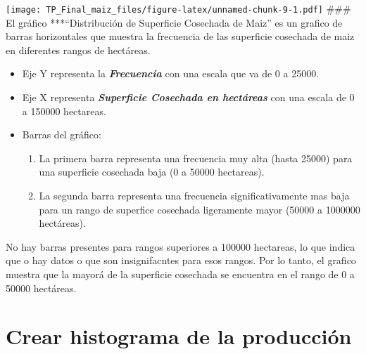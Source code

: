 \documentclass[
]{article}
\newenvironment{Shaded}{\begin{snugshade}}{\end{snugshade}}
\newcommand{\AttributeTok}[1]{\textcolor[rgb]{0.13,0.29,0.53}{#1}}
\newcommand{\DecValTok}[1]{\textcolor[rgb]{0.00,0.00,0.81}{#1}}
\newcommand{\FunctionTok}[1]{\textcolor[rgb]{0.13,0.29,0.53}{\textbf{#1}}}
\newcommand{\NormalTok}[1]{#1}
\newcommand{\SpecialCharTok}[1]{\textcolor[rgb]{0.81,0.36,0.00}{\textbf{#1}}}
\newcommand{\StringTok}[1]{\textcolor[rgb]{0.31,0.60,0.02}{#1}}
\begin{document}
\texttt{[image: TP\_Final\_maiz\_files/figure-latex/unnamed-chunk-9-1.pdf]}
\#\#\# El gráfico ***``Distribución de Superficie Cosechada de Maiz'' es
un grafico de barras horizontales que muestra la frecuencia de las
superficie cosechada de maiz en diferentes rangos de hectáreas.

\begin{itemize}
\item
  Eje Y representa la \textbf{\emph{Frecuencia}} con una escala que va
  de 0 a 25000.
\item
  Eje X representa \textbf{\emph{Superficie Cosechada en hectáreas}} con
  una escala de 0 a 150000 hectareas.
\item
  Barras del gráfico:

  \begin{enumerate}
  \def\labelenumi{\arabic{enumi}.}
  \item
    La primera barra representa una frecuencia muy alta (hasta 25000)
    para una superficie cosechada baja (0 a 50000 hectareas).
  \item
    La segunda barra representa una frecuencia significativamente mas
    baja para un rango de superfice cosechada ligeramente mayor (50000 a
    1000000 hectáreas).
  \end{enumerate}
\end{itemize}

No hay barras presentes para rangos superiores a 100000 hectareas, lo
que indica que o hay datos o que son insignifacntes para esos rangos.
Por lo tanto, el grafico muestra que la mayorá de la superficie
cosechada se encuentra en el rango de 0 a 50000 hectáreas.

\hypertarget{crear-histograma-de-la-producciuxf3n}{%
\section{Crear histograma de la
producción}\label{crear-histograma-de-la-producciuxf3n}}

\begin{Shaded}
\end{Shaded}
\end{document}
